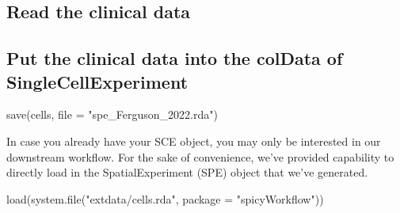 \documentclass[
  letterpaper,
  DIV=11,
  numbers=noendperiod]{scrreprt}
\newenvironment{Shaded}{\begin{snugshade}}{\end{snugshade}}
\newcommand{\AttributeTok}[1]{\textcolor[rgb]{0.40,0.45,0.13}{#1}}
\newcommand{\FunctionTok}[1]{\textcolor[rgb]{0.28,0.35,0.67}{#1}}
\newcommand{\NormalTok}[1]{\textcolor[rgb]{0.00,0.23,0.31}{#1}}
\newcommand{\OtherTok}[1]{\textcolor[rgb]{0.00,0.23,0.31}{#1}}
\newcommand{\SpecialCharTok}[1]{\textcolor[rgb]{0.37,0.37,0.37}{#1}}
\newcommand{\StringTok}[1]{\textcolor[rgb]{0.13,0.47,0.30}{#1}}
\begin{document}
\subsection{Read the clinical data}\label{read-the-clinical-data}

\begin{Shaded}
\end{Shaded}

\subsection{Put the clinical data into the colData of
SingleCellExperiment}\label{put-the-clinical-data-into-the-coldata-of-singlecellexperiment}

\begin{Shaded}
\end{Shaded}

\begin{Shaded}
\begin{Highlighting}[]
\FunctionTok{save}\NormalTok{(cells, }\AttributeTok{file =} \StringTok{"spe\_Ferguson\_2022.rda"}\NormalTok{)}
\end{Highlighting}
\end{Shaded}

In case you already have your SCE object, you may only be interested in
our downstream workflow. For the sake of convenience, we've provided
capability to directly load in the SpatialExperiment (SPE) object that
we've generated.

\begin{Shaded}
\begin{Highlighting}[]
\FunctionTok{load}\NormalTok{(}\FunctionTok{system.file}\NormalTok{(}\StringTok{"extdata/cells.rda"}\NormalTok{, }\AttributeTok{package =} \StringTok{"spicyWorkflow"}\NormalTok{))}
\end{Highlighting}
\end{Shaded}
\end{document}
